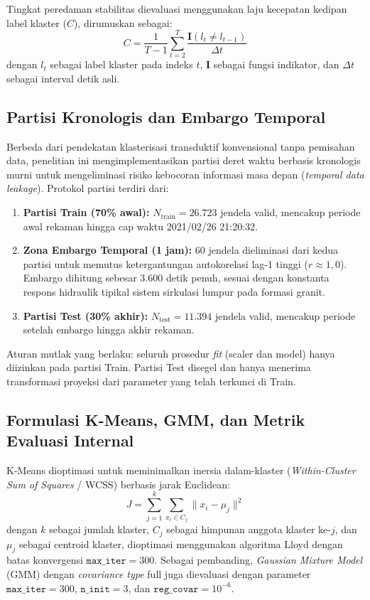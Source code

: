 \documentclass[conference]{IEEEtran}
\begin{document}
Tingkat peredaman stabilitas dievaluasi menggunakan laju kecepatan kedipan label klaster ($C$), dirumuskan sebagai:
\begin{equation}
C = \frac{1}{T-1} \sum_{t=2}^T \frac{\mathbf{I}(l_t \neq l_{t-1})}{\Delta t}
\end{equation}
dengan $l_t$ sebagai label klaster pada indeks $t$, $\mathbf{I}$ sebagai fungsi indikator, dan $\Delta t$ sebagai interval detik asli.

\subsection{Partisi Kronologis dan Embargo Temporal}
Berbeda dari pendekatan klasterisasi transduktif konvensional tanpa pemisahan data, penelitian ini mengimplementasikan partisi deret waktu berbasis kronologis murni untuk mengeliminasi risiko kebocoran informasi masa depan (\textit{temporal data leakage}). Protokol partisi terdiri dari:

\begin{enumerate}
\item \textbf{Partisi Train (70\% awal):} $N_{\text{train}} = 26.723$ jendela valid, mencakup periode awal rekaman hingga cap waktu 2021/02/26 21:20:32.
\item \textbf{Zona Embargo Temporal (1 jam):} 60 jendela dieliminasi dari kedua partisi untuk memutus ketergantungan autokorelasi lag-1 tinggi ($r \approx 1{,}0$). Embargo dihitung sebesar 3.600 detik penuh, sesuai dengan konstanta respons hidraulik tipikal sistem sirkulasi lumpur pada formasi granit.
\item \textbf{Partisi Test (30\% akhir):} $N_{\text{test}} = 11.394$ jendela valid, mencakup periode setelah embargo hingga akhir rekaman.
\end{enumerate}

Aturan mutlak yang berlaku: seluruh prosedur \textit{fit} (scaler dan model) hanya diizinkan pada partisi Train. Partisi Test disegel dan hanya menerima transformasi proyeksi dari parameter yang telah terkunci di Train.

\subsection{Formulasi K-Means, GMM, dan Metrik Evaluasi Internal}
K-Means dioptimasi untuk meminimalkan inersia dalam-klaster (\textit{Within-Cluster Sum of Squares} / WCSS) berbasis jarak Euclidean:
\begin{equation}
J = \sum_{j=1}^{k} \sum_{x_i \in C_j} \|x_i - \mu_j\|^2
\end{equation}
dengan $k$ sebagai jumlah klaster, $C_j$ sebagai himpunan anggota klaster ke-$j$, dan $\mu_j$ sebagai centroid klaster, dioptimasi menggunakan algoritma Lloyd dengan batas konvergensi $\texttt{max\_iter} = 300$. Sebagai pembanding, \textit{Gaussian Mixture Model} (GMM) dengan \textit{covariance type} full juga dievaluasi dengan parameter $\texttt{max\_iter} = 300$, $\texttt{n\_init} = 3$, dan $\texttt{reg\_covar} = 10^{-6}$.
\end{document}
